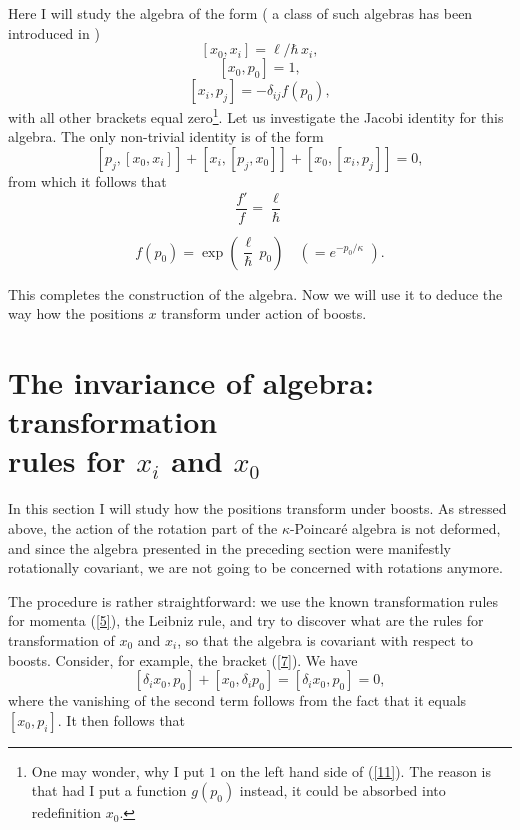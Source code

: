 \documentclass[a4paper,a4paper]{article}
\begin{document}
Here I will study the algebra of the form ( a class of such algebras has been introduced in \cite{luruza})
\begin{equation}\label{6}
  [ x_0, x_i] = \ell/\hbar \, x_i,
\end{equation}
\begin{equation}\label{7}
  [ x_0, p_0] = 1,
\end{equation}
\begin{equation}\label{8}
  [ x_i, p_j] = -\delta_{ij}f(p_0),
\end{equation}
with all other brackets equal zero\footnote{One may wonder, why I put $1$ on the left hand side of (\ref{11}). The reason is that had I put a function $g(p_0)$ instead, it could be absorbed into redefinition $x_0$.}. Let us investigate the Jacobi identity for this algebra. The only non-trivial identity is of the form
$$ [p_j, [x_0, x_i]] + [x_i, [p_j, x_0]] + [x_0, [x_i, p_j]] =0,$$
from which it follows that $$\frac{f'}{f}=\frac\ell\hbar$$

\begin{equation}\label{9}
   f(p_0) = \exp\left(\frac\ell\hbar\, p_0 \right) \quad \left( = e^{-p_0/\kappa} \,\, \right). 
\end{equation}

This completes the construction of the algebra. Now we will use it to deduce the way how the positions $x$ transform under action of boosts.



\section{The invariance of algebra: transformation\\ rules for $x_i$ and $x_0$}

In this section I will study how the   positions transform under boosts. As  stressed above, the action of the rotation part of the $\kappa$-Poincar\'e algebra is not deformed, and since the  algebra presented in the preceding section were manifestly rotationally covariant, we are not going to be concerned with rotations anymore.

The procedure is rather straightforward: we use the known transformation rules for momenta (\ref{5}), the Leibniz rule, and try to discover what are the rules for transformation of $x_0$ and $x_i$, so that the algebra is covariant with respect to boosts. Consider, for example, the bracket (\ref{7}). We have
$$ [\delta_i x_0, p_0] + [x_0, \delta_i p_0] = [\delta_i x_0, p_0] =0,$$
where the vanishing of the second term follows from the fact that it  equals  $[x_0,p_i]$. It  then follows that
\end{document}
